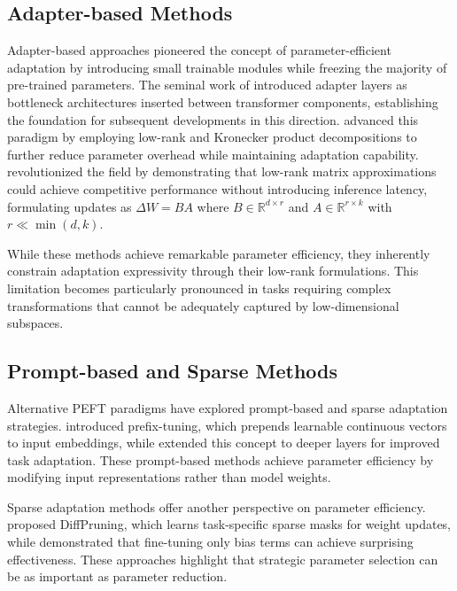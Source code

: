 \documentclass[10pt,letterpaper]{article}
\begin{document}
\subsection{Adapter-based Methods}

Adapter-based approaches pioneered the concept of parameter-efficient adaptation by introducing small trainable modules while freezing the majority of pre-trained parameters. The seminal work of \citet{houlsby2019parameter} introduced adapter layers as bottleneck architectures inserted between transformer components, establishing the foundation for subsequent developments in this direction. \citet{mahabadi2021compacter} advanced this paradigm by employing low-rank and Kronecker product decompositions to further reduce parameter overhead while maintaining adaptation capability. \citet{hu2021lora} revolutionized the field by demonstrating that low-rank matrix approximations could achieve competitive performance without introducing inference latency, formulating updates as $\Delta W = BA$ where $B \in \mathbb{R}^{d \times r}$ and $A \in \mathbb{R}^{r \times k}$ with $r \ll \min(d,k)$.

While these methods achieve remarkable parameter efficiency, they inherently constrain adaptation expressivity through their low-rank formulations. This limitation becomes particularly pronounced in tasks requiring complex transformations that cannot be adequately captured by low-dimensional subspaces.

\subsection{Prompt-based and Sparse Methods}

Alternative PEFT paradigms have explored prompt-based and sparse adaptation strategies. \citet{li2021prefix} introduced prefix-tuning, which prepends learnable continuous vectors to input embeddings, while \citet{liu2022p} extended this concept to deeper layers for improved task adaptation. These prompt-based methods achieve parameter efficiency by modifying input representations rather than model weights.

Sparse adaptation methods offer another perspective on parameter efficiency. \citet{guo2021parameter} proposed DiffPruning, which learns task-specific sparse masks for weight updates, while \citet{zaken2022bitfit} demonstrated that fine-tuning only bias terms can achieve surprising effectiveness. These approaches highlight that strategic parameter selection can be as important as parameter reduction.
\end{document}
